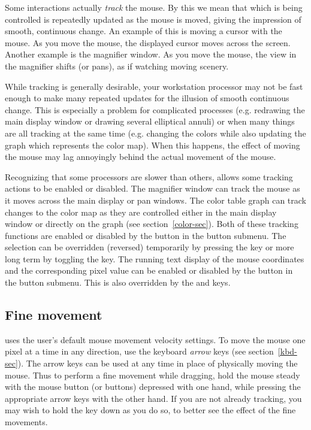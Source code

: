 Some interactions actually {\em track} the mouse.  By this we mean that
which is being controlled is repeatedly updated as the mouse is moved,
giving the impression of smooth, continuous change.  An example of this
is moving a cursor with the mouse.  As you move the mouse, the displayed
cursor moves across the screen.  Another example is the magnifier window.
As you move the mouse, the view in the magnifier shifts (or pans), as if
watching moving scenery.

While tracking is generally desirable, your workstation processor may
not be fast enough to make many repeated updates for the illusion of
smooth continuous change.  This is especially a problem for complicated
processes (e.g. redrawing the main display window or drawing several
elliptical annuli) or when many things are all tracking at the same time
(e.g. changing the colors while also updating the graph which represents
the color map).  When this happens, the effect of moving the mouse may
lag annoyingly behind the actual movement of the mouse.

Recognizing that some processors are slower than others, {\SAO} allows
some tracking actions to be enabled or disabled.  The magnifier window
can track the mouse as it moves across the main display or pan windows.
The color table graph can track changes to the color map as they are
controlled either in the main display window or directly on the graph
(see section~\ref{color-sec}).  Both of these tracking functions are enabled
or disabled by the  button in the  button submenu.  The
 selection can be overridden (reversed) temporarily by pressing
the  key or more long term by toggling the  key.  The
running text display of the mouse coordinates and the corresponding pixel
value can be enabled or disabled by the  button in the 
button submenu.  This is also overridden by the  and  keys. 

\subsection{ Fine movement }

{\SAO} uses the user's default mouse movement velocity settings.  To
move the mouse one pixel at a time in any direction, use the keyboard
{\em arrow} keys (see section~\ref{kbd-sec}).  The arrow keys can be used at any
time in place of physically moving the mouse.  Thus to perform a fine
movement while dragging, hold the mouse steady with the mouse button (or
buttons) depressed with one hand, while pressing the appropriate arrow
keys with the other hand.  If you are not already tracking, you may wish
to hold the  key down as you do so, to better see the effect
of the fine movements.

